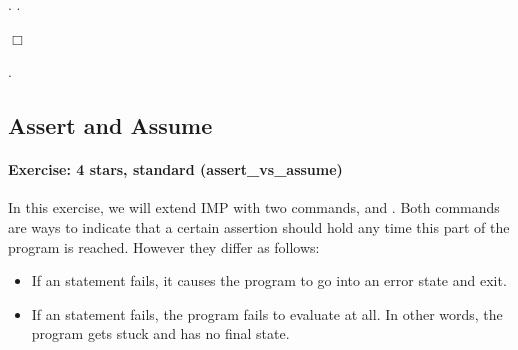 \documentclass[12pt]{report}
\begin{document}
{{{{{{\begin{coqdoccode}
\coqdocindent{1.00em}
  .\coqdoceol
\coqdocindent{1.00em}
  .\coqdoceol
\coqdocemptyline
\end{coqdoccode}
\ensuremath{\Box} 
\begin{coqdoccode}
\coqdocemptyline
\coqdocnoindent
{} .\coqdoceol
\coqdocemptyline
\end{coqdoccode}
\subsection{Assert and Assume}



\paragraph{Exercise: 4 stars, standard (assert\_vs\_assume)}




    In this exercise, we will extend IMP with two commands, 
    and . Both commands are ways to indicate that a certain
    assertion should hold any time this part of the program is
    reached. However they differ as follows:



\begin{itemize}
\item  If an  statement fails, it causes the program to go into
      an error state and exit.



\item  If an  statement fails, the program fails to evaluate at
      all. In other words, the program gets stuck and has no final
      state.

\end{itemize}


}}}}}}
\end{document}
